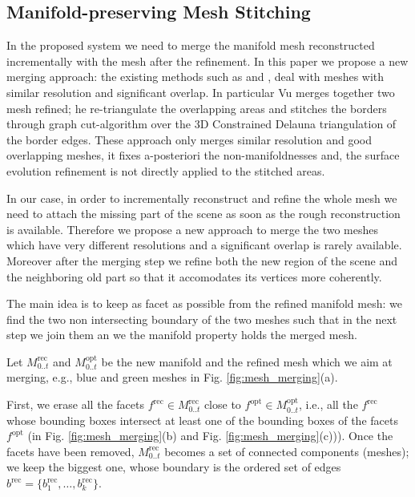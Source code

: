 \subsection{Manifold-preserving Mesh Stitching}
\label{sec:Mesh_merging}
In the proposed system we need to merge the manifold mesh reconstructed incrementally with the mesh after the refinement.
In this paper we propose a new merging approach: the existing methods such as \cite{turk1994zippered} and \cite{VuPhD011},  deal with meshes with similar resolution and significant overlap. 
In particular  Vu   \cite{VuPhD011} merges together two mesh refined; he re-triangulate the overlapping areas and stitches the borders through graph cut-algorithm over the 3D Constrained Delauna triangulation of the border edges.
These approach only merges similar resolution and good overlapping meshes, it fixes a-posteriori the non-manifoldnesses and, the surface evolution refinement is not directly applied to the stitched areas.

In our case, in order to incrementally reconstruct and refine the whole mesh we need to attach the missing part of the scene as soon as the rough reconstruction is available. Therefore we propose a new approach to merge the two meshes which have very different resolutions and a significant overlap is rarely available. Moreover after the merging step we refine both the new region of the scene and the neighboring old part so that it accomodates its vertices more coherently.


The main idea is to keep as facet as possible from the refined manifold mesh: we find the two non intersecting boundary of the two meshes such that in the next step we join them an we the manifold property holds the merged mesh.

Let $\mathit{M}_{0..t}^{\text{rec}}$ and  $\mathit{M}_{0..t}^{\text{opt}}$ be the new manifold and the refined mesh which we aim at merging, e.g., blue and green meshes in Fig. \ref{fig:mesh_merging}(a).


First, we erase all the facets  $f^{\text{rec}} \in \mathit{M}_{0..t}^{\text{rec}}$ close to $f^{\text{opt}} \in \mathit{M}_{0..t}^{\text{opt}}$, i.e., all the $f^{\text{rec}}$ whose bounding boxes intersect at least one of the bounding boxes of the facets $f^{\text{opt}}$ (in Fig. \ref{fig:mesh_merging}(b) and Fig. \ref{fig:mesh_merging}(c))).
Once the facets have been removed, $\mathit{M}_{0..t}^{\text{rec}}$ becomes a set of connected components (meshes); we keep the biggest one, whose boundary is the ordered set of edges $\mathit{b}^{\text{rec}} = \{b_1^{\text{rec}}, \dots,  b_k^{\text{rec}}\}$.

